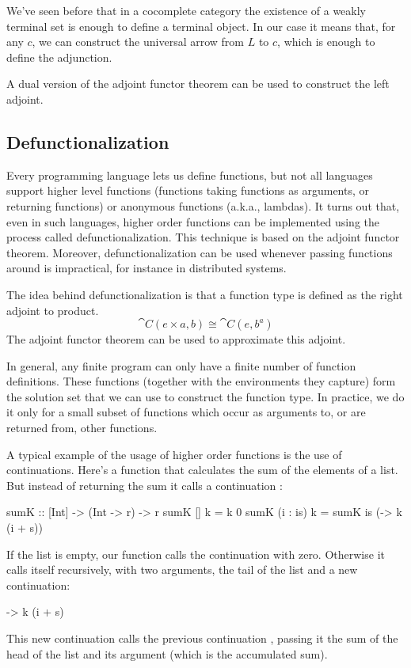 \documentclass[DaoFP]{subfiles}
\begin{document}
We've seen before that in a cocomplete category the existence of a weakly terminal set is enough to define a terminal object. In our case it means that, for any $c$, we can construct the universal arrow from $L$ to $c$, which is enough to define the adjunction.

A dual version of the adjoint functor theorem can be used to construct the left adjoint.

\subsection{Defunctionalization}

Every programming language lets us define functions, but not all languages support higher level functions (functions taking functions as arguments, or returning functions) or anonymous functions (a.k.a., lambdas). It turns out that, even in such languages, higher order functions can be implemented using the process called defunctionalization. This technique is based on the adjoint functor theorem. Moreover, defunctionalization can be used whenever passing functions around is impractical, for instance in distributed systems.

The idea behind defunctionalization is that a function type is defined as the right adjoint to product. 
\[ \cat C(e \times a, b) \cong \cat C(e, b^a) \]
The adjoint functor theorem can be used to approximate this adjoint. 

In general, any finite program can only have a finite number of function definitions. These functions (together with the environments they capture) form the solution set that we can use to construct the function type. In practice, we do it only for a small subset of functions which occur as arguments to, or are returned from, other functions.

A typical example of the usage of higher order functions is the use of continuations. Here's a function that calculates the sum of the elements of a list. But instead of returning the sum it calls a continuation :
\begin{haskell}
sumK :: [Int] -> (Int -> r) -> r
sumK [] k = k 0
sumK (i : is) k =
  sumK is (\s -> k (i + s))
\end{haskell}
If the list is empty, our function calls the continuation with zero. Otherwise it calls itself recursively, with two arguments, the tail of the list  and a new continuation:
\begin{haskell}
\s -> k (i + s)
\end{haskell}
This new continuation calls the previous continuation , passing it the sum of the head of the list and its argument  (which is the accumulated sum). 
\end{document}
